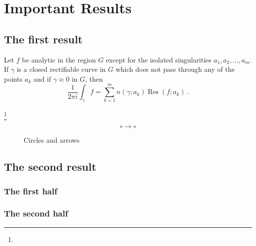 
\chapter{Important Results}

\section{The first result}

\begin{thm}
Let $f$ be analytic in the region $G$ except for the isolated 
singularities $a_1,a_2,\dots,a_m$. If $\gamma$ is a closed 
rectifiable curve in $G$ which does not pass through any of the 
points $a_k$ and if $\gamma\approx 0$ in $G$, then
\[
  \frac{1}{2\pi i}\int_\gamma\! f = \sum_{k=1}^m 
  n(\gamma;a_k)\mathop{\mathrm{Res}}(f;a_k)\,.
\]
\end{thm}

\blindtext\footnote{\blindtext}

\begin{figure}
  \[ \circ \to \circ \]
  \caption{Circles and arrows}
\end{figure}

\section{The second result}

\subsection{The first half}
  
\blindtext\pagenote{\blindtext}

\subsection{The second half}

\blindtext
